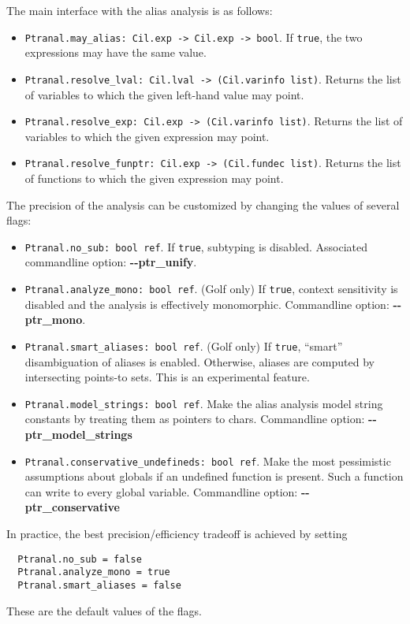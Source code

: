 \documentclass[letterpaper]{article}
\def\t#1{{\tt #1}}
\begin{document}
The main interface with the alias analysis is as follows:
\begin{itemize}
\item \t{Ptranal.may\_alias: Cil.exp -> Cil.exp -> bool}. If
  \t{true}, the two expressions may have the same value.
\item \t{Ptranal.resolve\_lval: Cil.lval -> (Cil.varinfo
    list)}.  Returns the list of variables to which the given
  left-hand value may point.
\item \t{Ptranal.resolve\_exp: Cil.exp -> (Cil.varinfo list)}.
  Returns the list of variables to which the given expression may
  point.
\item \t{Ptranal.resolve\_funptr: Cil.exp -> (Cil.fundec
    list)}. Returns the list of functions to which the given
  expression may point.
\end{itemize}

The precision of the analysis can be customized by changing the values
of several flags:

\begin{itemize}
\item \t{Ptranal.no\_sub: bool ref}.
  If \t{true}, subtyping is disabled.  Associated commandline option:
  {\bf -{}-ptr\_unify}.
\item \t{Ptranal.analyze\_mono: bool ref}.
  (Golf only) If \t{true}, context sensitivity is disabled and the
  analysis is effectively monomorphic.  Commandline option:
  {\bf -{}-ptr\_mono}.
\item \t{Ptranal.smart\_aliases: bool ref}.
  (Golf only) If \t{true}, ``smart'' disambiguation of aliases is
  enabled.  Otherwise, aliases are computed by intersecting points-to
  sets.  This is an experimental feature.
\item \t{Ptranal.model\_strings: bool ref}.
  Make the alias analysis model string constants by treating them as
  pointers to chars.  Commandline option: {\bf -{}-ptr\_model\_strings}
\item \t{Ptranal.conservative\_undefineds: bool ref}.
  Make the most pessimistic assumptions about globals if an undefined
  function is present.  Such a function can write to every global
  variable.  Commandline option: {\bf -{}-ptr\_conservative}
\end{itemize}

In practice, the best precision/efficiency tradeoff is achieved by
setting 
\begin{verbatim}
  Ptranal.no_sub = false
  Ptranal.analyze_mono = true
  Ptranal.smart_aliases = false
\end{verbatim}
These are the
default values of the flags.
\end{document}
